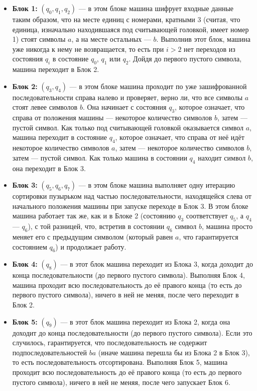 \documentclass[a4paper,12pt]{article}
\newcommand {\gu} [1] {\guillemotleft#1\guillemotright}
\begin{document}
    \begin{itemize}
        \item \textbf{Блок 1:} {\boldmath $(q_0, q_1, q_2)$} --- в этом блоке машина \gu{шифрует} входные данные таким образом, что на месте единиц с номерами, кратными $3$ (считая, что единица, изначально находившаяся под считывающей головкой, имеет номер 1) стоят символы \gu{$a$}, а на месте остальных --- \gu{$b$}. Выполнив этот блок, машина уже никогда к нему не возвращается, то есть при $i>2$ нет переходов из состояния $q_i$ в состояние $q_0$, $q_1$ или $q_2$. Дойдя до первого пустого символа, машина переходит в Блок 2.
        \item \textbf{Блок 2:} {\boldmath $(q_3, q_4)$} --- в этом блоке машина проходит по уже зашифрованной последовательности справа налево и проверяет, верно ли, что все символы \gu{$a$} стоят левее символов \gu{$b$}. Она начинает с состояния $q_3$, которое \gu{означает}, что справа от положения машины --- некоторое количество символов \gu{$b$}, затем --- пустой символ. Как только под считывающей головкой оказывается символ \gu{$a$}, машина переходит в состояние $q_4$, которое \gu{означает}, что справа от неё идёт некоторое количество символов \gu{$a$}, затем --- некоторое количество символов  \gu{$b$}, затем --- пустой символ. Как только машина в состоянии $q_4$ \gu{находит} символ \gu{$b$}, она переходит в Блок 3.
        \item \textbf{Блок 3:} {\boldmath $(q_5, q_6, q_7)$} --- в этом блоке машина выполняет одну итерацию сортировки пузырьком над частью последовательности, находящейся слева от начального положения машины при запуске переходе в Блок 3. В этом блоке машина работает так же, как и в Блоке 2 (состоянию $q_3$ соответствует $q_5$, а $q_4$ --- $q_6$), с той разницей, что, встретив в состоянии $q_6$ символ \gu{$b$}, машина просто меняет его с предыдущим символом (который равен  \gu{$a$}, что гарантируется состоянием $q_6$) и продолжает работу.
        \item \textbf{Блок 4:} {\boldmath $(q_8)$} --- в этот блок машина переходит из Блока 3, когда доходит до конца последовательности (до первого пустого символа). Выполняя Блок 4, машина проходит всю последовательность до её правого конца (то есть до первого пустого символа), ничего в ней не меняя, после чего переходит в Блок 2.
        \item \textbf{Блок 5:} {\boldmath $(q_9)$} --- в этот блок машина переходит из Блока 2, когда она доходит до конца последовательности (до первого пустого символа). Если это случилось, гарантируется, что последовательность не содержит подпоследовательностей \gu{$ba$} (иначе машина перешла бы из Блока 2 в Блок 3), то есть последовательность отсортирована. Выполняя Блок 5, машина проходит всю последовательность до её правого конца (то есть до первого пустого символа), ничего в ней не меняя, после чего запускает Блок 6. 

\end{itemize}
\end{document}
